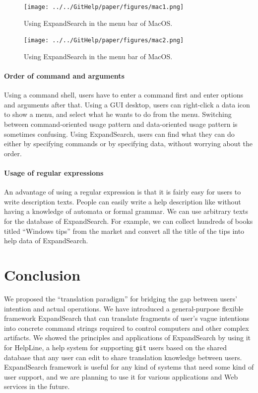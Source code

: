 \documentclass[manuscript,screen,review]{acmart}
\def\HL{\textsf{HelpLine}}
\def\GIT{\texttt{git}}
\def\ES{\textsf{ExpandSearch}}
\begin{document}
\begin{figure}[h]
  \centerline{\texttt{[image: ../../GitHelp/paper/figures/mac1.png]}}
  \caption{Using {\ES} in the menu bar of MacOS.}
  \label{mac1}
\end{figure}

\begin{figure}[h]
  \centerline{\texttt{[image: ../../GitHelp/paper/figures/mac2.png]}}
  \caption{Using {\ES} in the menu bar of MacOS.}
  \label{mac2}
\end{figure}

\paragraph{Order of command and arguments}

Using a command shell,
users have to enter a command first and enter options and arguments after that.
Using a GUI desktop,
users can right-click a data icon to show a menu,
and select what he wants to do from the menu.
Switching between command-oriented usage pattern and
data-oriented usage pattern is sometimes confusing.
Using {\ES}, users can find what they can do
either by specifying commands or by specifying data, 
without worrying about the order.

\paragraph{Usage of regular expressions}

An advantage of using a regular expression is that
it is fairly easy for users to write description texts.
People can easily write a help description like
without having a knowledge of automata or formal grammar.
We can use arbitrary texts for the database of {\ES}.
For example,
we can collect hundreds of books titled ``Windows tips'' from the market
and convert all the title of the tips into help data of {\ES}.

\section{Conclusion}

We proposed the ``translation paradigm'' for bridging the gap between
users' intention and actual operations.
%
We have introduced a general-purpose flexible framework {\ES}
that can translate fragments of user's vague intentions into
concrete command strings required to control computers and
other complex artifacts.
We showed the principles and applications of {\ES} by using it
for {\HL}, a help system for supporting {\GIT} users
based on the shared database that any user can edit to share
translation knowledge between users.
%
{\ES} framework is useful for any kind of systems that need
some kind of user support, and we are planning to use it
for various applications and Web services in the future.
\end{document}
